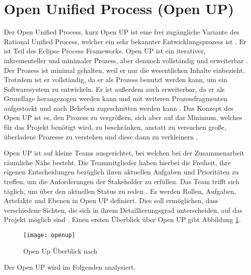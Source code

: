 \section{Open Unified Process (Open UP)}


Der Open Unified Process, kurz Open UP ist eine frei zugängliche Variante des Rational Unified Process, welcher ein sehr bekannter Entwicklungsprozess ist \cite{hauber2010}.  Er ist Teil des Eclipse Process Frameworks. Open UP ist ein iterativer, inkrementeller und minimaler Prozess, aber dennoch vollständig und erweiterbar \cite{Gau2006, Basem2010}. Der Prozess ist minimal gehalten, weil er nur die wesentlichen Inhalte einbezieht. Trotzdem ist er vollständig, da er als Prozess benutzt werden kann, um ein Softwaresystem zu entwickeln. Er ist außerdem auch erweiterbar, da er als Grundlage herangezogen werden kann und mit weiteren Prozessfragmenten aufgestockt und nach Belieben zugeschnitten werden kann \cite{Wang2007}. Das Konzept des Open UP ist es, den Prozess zu vergrößern, sich aber auf das Minimum, welches für das Projekt benötigt wird, zu beschränken, anstatt zu versuchen große, überladene Prozesse zu verstehen und diese dann zu verkleinern \cite{ambler2012}.  \newline



Open UP ist auf kleine Teams ausgerichtet, bei welchen bei der Zusammenarbeit räumliche Nähe besteht. Die Teammitglieder haben hierbei die Freiheit, ihre eigenen Entscheidungen bezüglich ihren aktuellen Aufgaben und Prioritäten zu treffen, um die Anforderungen der Stakeholder zu erfüllen. Das Team trifft sich täglich, um über den aktuellen Status zu reden \cite{OpenUPProcess}.\newline
Es werden Rollen, Aufgaben, Artefakte und Ebenen in Open UP definiert. Dies soll ermöglichen, dass verschiedene Sichten, die sich in ihrem Detaillierungsgrad unterscheiden, auf das Projekt möglich sind \cite{freudenreichevaluierung}. Einen ersten Überblick über Open UP gibt Abbildung \ref{fig:openup}.


\begin{figure}[htp]
\begin{center}
  \texttt{[image: openup]} %
  \caption{Open Up Überblick nach \cite{eclipseopenup}}
  \label{fig:openup}
\end{center}
\end{figure}

Der Open UP wird im Folgenden analysiert.


